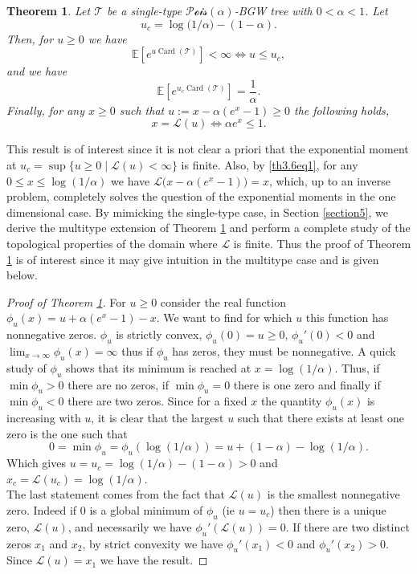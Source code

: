 \documentclass[reqno,final,11pt]{amsart}
\theoremstyle{plain}
\newtheorem{theorem}{Theorem}[section]
\theoremstyle{definition}
\theoremstyle{remark}
\newcommand{\E}[1]{\mathds{E}\left[#1\right]}
\newcommand{\T}{\mathcal{T}}
\renewcommand{\L}{\bm{\mathscr{L}}}
\newcommand{\Pois}{\mathscr{P}\!\mathscr{o}\!\mathscr{i}\!\mathscr{s}}
\DeclareMathOperator{\card}{Card}
\begin{document}
\begin{theorem}\label{theorem3.6}
	Let $\T$ be a single-type $\Pois(\alpha)$-BGW tree with $0<\alpha<1$. Let 
	\begin{equation}
		u_c = \log\big(1/\alpha\big) -(1-\alpha).
	\end{equation}
	Then, for $u\geq 0$ we have
	\begin{equation}
		\E{e^{u \card(\T)}} < \infty \iff u \leq u_c,
	\end{equation}
	and we have
	\begin{equation}
		\E{e^{u_c \card(\T)}} = \frac{1}{\alpha}.
	\end{equation}
	Finally, for any $x \geq 0$ such that $u := x - \alpha (e^x-1) \geq 0$ the following holds,
	\begin{equation}\label{th3.6eq1}
		x = \L(u) \iff \alpha e^x \leq 1.
	\end{equation}
\end{theorem}

This result is of interest since it is not clear a priori that the exponential moment at $u_c = \sup\{ u\geq 0 \mid \L(u)<\infty\}$ is finite. Also, by \eqref{th3.6eq1}, for any $0\leq x \leq \log(1/\alpha)$ we have $\L\big(x-\alpha(e^x-1)\big) = x$, which, up to an inverse problem, completely solves the question of the exponential moments in the one dimensional case. By mimicking the single-type case, in Section \ref{section5}, we derive the multitype extension of Theorem \ref{theorem3.6} and perform a complete study of the topological properties of the domain where $\L$ is finite. Thus the proof of Theorem \ref{theorem3.6} is of interest since it may give intuition in the multitype case and is given below.

\begin{proof}[Proof of Theorem \ref{theorem3.6}]
For $u\geq 0$ consider the real function $\phi_u(x) = u + \alpha(e^x-1) - x$. We want to find for which $u$ this function has nonnegative zeros. $\phi_u$ is strictly convex, $\phi_u(0)=u\geq 0$, $\phi_u'(0) < 0$ and $\lim_{x\to\infty} \phi_u(x) = \infty$ thus if $\phi_u$ has zeros, they must be nonnegative. A quick study of $\phi_u$ shows that its minimum is reached at $x = \log(1/\alpha)$. Thus, if $\min \phi_u  > 0$ there are no zeros, if $\min \phi_u  = 0$ there is one zero and finally if $\min \phi_u  < 0$ there are two zeros. Since for a fixed $x$ the quantity $\phi_u(x)$ is increasing with $u$, it is clear that the largest $u$ such that there exists at least one zero is the one such that \[0 = \min \phi_u = \phi_u(\log(1/\alpha)) =  u + (1-\alpha) - \log(1/\alpha).\]
	Which gives $u = u_c = \log(1/\alpha) - (1-\alpha) > 0$ and $x_c = \L(u_c) = \log(1/\alpha)$.\\
	The last statement comes from the fact that $\L(u)$ is the smallest nonnegative zero. Indeed if $0$ is a global minimum of $\phi_u$ (ie $u=u_c$) then there is a unique zero, $\L(u)$, and necessarily we have $\phi_u'(\L(u)) = 0$. If there are two distinct zeros $x_1$ and $x_2$, by strict convexity we have $\phi_u'(x_1)<0$ and $\phi_u'(x_2) > 0$. Since $\L(u) = x_1$ we have the result.
\end{proof}
\end{document}
